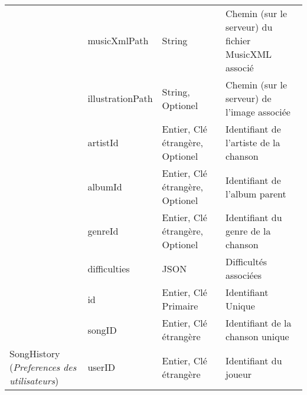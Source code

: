 \begin{longtable}[c]{@{}|p{}|p{}|p{}|p{}|@{}}
														& musicXmlPath                                         & String                                                                                   & Chemin (sur le serveur) du fichier MusicXML associé                                      \\* \cline{2-4} 
														& illustrationPath                                     & String, Optionel                                                                         & Chemin (sur le serveur) de l’image associée                                              \\* \cline{2-4} 
														& artistId                                             & Entier, Clé étrangère, Optionel                                                          & Identifiant de l’artiste de la chanson                                                   \\* \cline{2-4} 
														& albumId                                              & Entier, Clé étrangère, Optionel                                                          & Identifiant de l’album parent                                                            \\* \cline{2-4} 
														& genreId                                              & Entier, Clé étrangère, Optionel                                                          & Identifiant du genre de la chanson                                                       \\* \cline{2-4} 
							                            & difficulties                                         & JSON                                                                                     & Difficultés associées                                                                    \\* \hline
														& id                                                   & Entier, Clé Primaire                                                                     & Identifiant Unique                                                                       \\* \cline{2-4} 
														& songID                                               & Entier, Clé étrangère                                                                    & Identifiant de la chanson unique                                                         \\* \cline{2-4} 
	\multirow{-3}{0.18\textwidth}{SongHistory (\textit{Preferences des utilisateurs})}						& userID                                               & Entier, Clé étrangère                                                                    & Identifiant du joueur                                                                    \\* \cline{2-4} 

\end{longtable}
